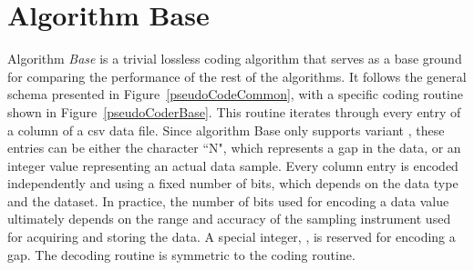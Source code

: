 

\clearpage
\section{Algorithm Base}
\label{algo:base}
\newcommand{\codeColumn}{$\text{code\_column}$}
\newcommand{\decodeColumn}{$\text{decode\_column}$}

\vspace{-10pt}
Algorithm \textit{Base} is a trivial lossless coding algorithm that serves as a base ground for comparing the performance of the rest of the algorithms. It follows the general schema presented in Figure~\ref{pseudoCodeCommon}, with a specific coding routine shown in Figure~\ref{pseudoCoderBase}. This routine iterates through every entry of a column of a csv data file. Since algorithm Base only supports variant \NOmaskalgo, these entries can be either the character ``N", which represents a gap in the data, or an integer value representing an actual data sample. Every column entry is encoded independently and using a fixed number of bits, which depends on the data type and the dataset. In practice, the number of bits used for encoding a data value ultimately depends on the range and accuracy of the sampling instrument used for acquiring and storing the data. A special integer, \nodata, is reserved for encoding a gap. The decoding routine is symmetric to the coding routine.




